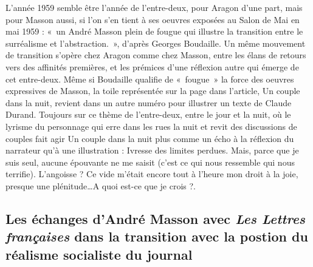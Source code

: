 L’année 1959 semble être l’année de l’entre-deux, pour Aragon d’une part, mais pour Masson aussi, si l’on s’en tient à ses oeuvres exposées au Salon de Mai en mai 1959 : « un André Masson plein de fougue qui illustre la transition entre le surréalisme et l’abstraction. », d’après Georges Boudaille. Un même mouvement de transition s’opère chez Aragon comme chez Masson, entre les élans de retours vers des affinités premières, et les prémices d’une réflexion autre qui émerge de cet entre-deux. Même si Boudaille qualifie de « fougue » la force des oeuvres expressives de Masson, la toile représentée sur la page dans l’article, Un couple dans la nuit, revient dans un autre numéro pour illustrer un texte de Claude Durand. Toujours sur ce thème de l’entre-deux, entre le jour et la nuit, où le lyrisme du personnage qui erre dans les rues la nuit et revit des discussions de couples fait agir Un couple dans la nuit plus comme un écho à la réflexion du narrateur qu’à une illustration : 
Ivresse des limites perdues. Mais, parce que je suis seul, aucune épouvante ne me saisit (c’est ce qui nous ressemble qui nous terrifie). L’angoisse ? Ce vide m’était encore tout à l’heure mon droit à la joie, presque une plénitude…A quoi est-ce que je crois ?.

\subsection{Les échanges d'André Masson avec \emph{Les Lettres françaises }dans la transition avec la postion du réalisme socialiste du journal}
